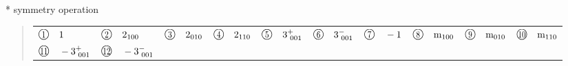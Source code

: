 \documentclass[fleqn,10pt,landscape]{jsarticle}
\begin{document}
* symmetry operation
\begin{quote}
\begin{tabular}{llllllllll}
$ {\ooalign{\hfil\resizebox{.8\width}{\height}{1}\hfil\crcr\raise.1ex\hbox{\large$\bigcirc$}}}\quad 1 $ & $ {\ooalign{\hfil\resizebox{.8\width}{\height}{2}\hfil\crcr\raise.1ex\hbox{\large$\bigcirc$}}}\quad 2{}_{100} $ & $ {\ooalign{\hfil\resizebox{.8\width}{\height}{3}\hfil\crcr\raise.1ex\hbox{\large$\bigcirc$}}}\quad 2{}_{010} $ & $ {\ooalign{\hfil\resizebox{.8\width}{\height}{4}\hfil\crcr\raise.1ex\hbox{\large$\bigcirc$}}}\quad 2{}_{110} $ & $ {\ooalign{\hfil\resizebox{.8\width}{\height}{5}\hfil\crcr\raise.1ex\hbox{\large$\bigcirc$}}}\quad 3^{+}_{\,\,001} $ & $ {\ooalign{\hfil\resizebox{.8\width}{\height}{6}\hfil\crcr\raise.1ex\hbox{\large$\bigcirc$}}}\quad 3^{-}_{\,\,001} $ & $ {\ooalign{\hfil\resizebox{.8\width}{\height}{7}\hfil\crcr\raise.1ex\hbox{\large$\bigcirc$}}}\quad -1 $ & $ {\ooalign{\hfil\resizebox{.8\width}{\height}{8}\hfil\crcr\raise.1ex\hbox{\large$\bigcirc$}}}\quad {\rm m}_{100} $ & $ {\ooalign{\hfil\resizebox{.8\width}{\height}{9}\hfil\crcr\raise.1ex\hbox{\large$\bigcirc$}}}\quad {\rm m}_{010} $ & $ {\ooalign{\hfil\resizebox{.8\width}{\height}{10}\hfil\crcr\raise.1ex\hbox{\large$\bigcirc$}}}\quad {\rm m}_{110} $ \\
$ {\ooalign{\hfil\resizebox{.8\width}{\height}{11}\hfil\crcr\raise.1ex\hbox{\large$\bigcirc$}}}\quad -3^{+}_{\,\,001} $ & $ {\ooalign{\hfil\resizebox{.8\width}{\height}{12}\hfil\crcr\raise.1ex\hbox{\large$\bigcirc$}}}\quad -3^{-}_{\,\,001} $ & $  $ & $  $ & $  $ & $  $ & $  $ & $  $ & $  $ & $  $
\end{tabular}
\end{quote}
\end{document}
